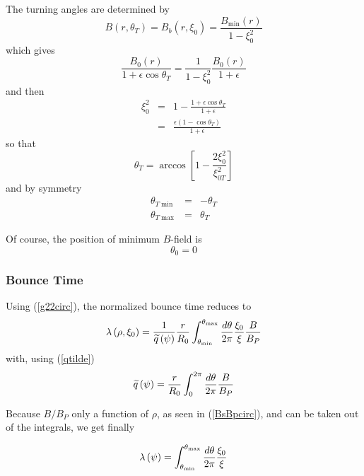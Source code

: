 \documentclass{article}
\begin{document}
The turning angles are determined by 
\begin{equation}
B\left( r,\theta _{T}\right) =B_{b}\left( r,\xi _{0}\right) =\frac{B_{\min
}\left( r\right) }{1-\xi _{0}^{2}}
\end{equation}
which gives 
\begin{equation}
\frac{B_{0}\left( r\right) }{1+\epsilon \cos \theta _{T}}=\frac{1}{1-\xi
_{0}^{2}}\frac{B_{0}\left( r\right) }{1+\epsilon }
\end{equation}
and then 
\begin{eqnarray}
\xi _{0}^{2} &=&1-\frac{1+\epsilon \cos \theta _{T}}{1+\epsilon } \\
&=&\frac{\epsilon \left( 1-\cos \theta _{T}\right) }{1+\epsilon }
\end{eqnarray}
so that 
\begin{equation}
\theta _{T}=\arccos \left[ 1-\frac{2\xi _{0}^{2}}{\xi _{0T}^{2}}\right]
\end{equation}
and by symmetry 
\begin{eqnarray}
\theta _{T\min } &=&-\theta _{T} \\
\theta _{T\max } &=&\theta _{T}
\end{eqnarray}

Of course, the position of minimum $B$-field is 
\begin{equation}
\theta _{0}=0
\end{equation}

\subsubsection{Bounce Time}

Using (\ref{g22circ}), the normalized bounce time reduces to 
\begin{equation}
\lambda \left( \rho ,\xi _{0}\right) =\frac{1}{\widetilde{q}\left( \psi
\right) }\frac{r}{R_{0}}\int_{\theta _{\min }}^{\theta _{\max }}\frac{%
d\theta }{2\pi }\frac{\xi _{0}}{\xi }\frac{B}{B_{P}}
\end{equation}
with, using (\ref{qtilde})
\begin{equation}
\widetilde{q}\left( \psi \right) =\frac{r}{R_{0}}\int_{0}^{2\pi }\frac{%
d\theta }{2\pi }\frac{B}{B_{P}}
\end{equation}

Because $B/B_{P}$ only a function of $\rho $, as seen in (\ref{BsBpcirc}),
and can be taken out of the integrals, we get finally

\begin{equation}
\lambda \left( \psi \right) =\int_{\theta _{\min }}^{\theta _{\max }}\frac{%
d\theta }{2\pi }\frac{\xi _{0}}{\xi }  \label{lambdacirc}
\end{equation}
\end{document}
